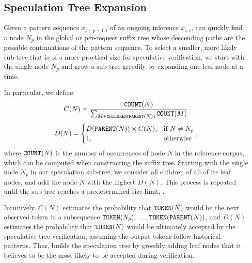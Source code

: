 \subsection{Speculation Tree Expansion}
\label{suffixdecoding:sec:expansion}

Given a pattern sequence \( x_{t-p+1:t} \) of an ongoing inference \( x_{1:t} \), \SuffixDecoding can quickly find a node \( N_p \) in the global or per-request suffix tree whose descending paths are the possible continuations of the pattern sequence. To select a smaller, more likely sub-tree that is of a more practical size for speculative verification, we start with the single node \( N_p \) and grow a sub-tree greedily by expanding one leaf node at a time.

In particular, we define:
\[
C(N) = \frac{\texttt{COUNT}(N)}{\sum_{M \in \texttt{CHILDREN}(\texttt{PARENT}(N))} \texttt{COUNT}(M)}
\]
\[
D(N) = \begin{cases}
    D(\texttt{PARENT}(N)) \times C(N), & \text{if $N \neq N_p$}\\
    1, & \text{otherwise}
\end{cases},
\]
where \( \texttt{COUNT}(N) \) is the number of occurrences of node \( N \) in the reference corpus, which can be computed when constructing the suffix tree. Starting with the single node \( N_p \) in our speculation sub-tree, we consider all children of all of its leaf nodes, and add the node \( N \) with the highest \( D(N) \). This process is repeated until the sub-tree reaches a predetermined size limit, \sdMaxSpec.

Intuitively, \( C(N) \) estimates the probability that \( \texttt{TOKEN}(N) \) would be the next observed token in a subsequence \( \texttt{TOKEN}(N_p), \ldots, \texttt{TOKEN}(\texttt{PARENT}(N))\), and \( D(N) \) estimates the probability that \( \texttt{TOKEN}(N) \) would be ultimately accepted by the speculative tree verification, assuming the output tokens follow historical patterns.
Thus, \SuffixDecoding builds the speculation tree by greedily adding leaf nodes that it believes to be the most likely to be accepted during verification.

